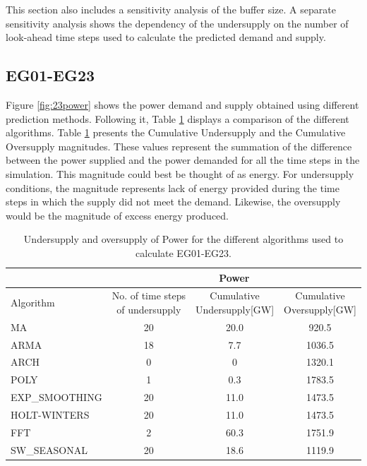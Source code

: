 \documentclass[11pt,letterpaper]{article}
\begin{document}
This section also includes a sensitivity analysis of the buffer size. A separate sensitivity analysis shows the dependency of the undersupply on the number of look-ahead time steps used to calculate the predicted demand and supply.

\subsection{EG01-EG23}

Figure \ref{fig:23power} shows the power demand and supply obtained using different prediction methods. Following it, Table \ref{tab:23-power} displays a comparison of the different algorithms. Table \ref{tab:23-power} presents the Cumulative Undersupply and the Cumulative Oversupply magnitudes. These values represent the summation of the difference between the power supplied and the power demanded for all the time steps in the simulation. This magnitude could best be thought of as energy. For undersupply conditions, the magnitude represents lack of energy provided during the time steps in which the supply did not meet the demand. Likewise, the oversupply would be the magnitude of excess energy produced.

\begin{table}[!h]
	\centering
	\caption {Undersupply and oversupply of Power for the different algorithms used to calculate EG01-EG23.}
	\label{tab:23-power}
	\begin{tabular}{|l|c|c|c|}
		\hline
		& \multicolumn{3}{c|}{Power} \\ \hline
		Algorithm & \shortstack{No. of time steps\\of undersupply}  & 
		\shortstack{Cumulative\\Undersupply[GW]}  & \shortstack{Cumulative\\Oversupply[GW]} \\ \hline
		MA        & 20 	& 20.0  &  920.5   \\ \hline
		ARMA      & 18 	&  7.7  &  1036.5  \\ \hline
		ARCH      &  0 	&   0  	&  1320.1  \\ \hline
		POLY      &  1 	&  0.3 	&  1783.5  \\ \hline
		EXP\_SMOOTHING 	& 20 	& 11.0 & 1473.5 \\ \hline
		HOLT-WINTERS  	& 20 	& 11.0 & 1473.5 \\ \hline
		FFT       & 2 	& 60.3 	& 1751.9 	\\ \hline
		SW\_SEASONAL    & 20 	& 18.6 	& 1119.9 	\\ \hline
	\end{tabular}
\end{table}
\end{document}
